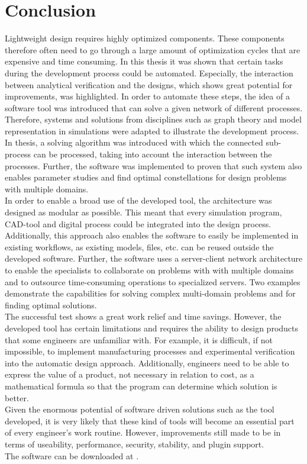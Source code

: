 \section{Conclusion}

Lightweight design requires highly optimized components.
These components therefore often need to go through a large amount of optimization cycles that are expensive and time consuming.
In this thesis it was shown that certain tasks during the development process could be automated.
Especially, the interaction between analytical verification and the designs, which shows great potential for improvements, was highlighted.
In order to automate these steps, the idea of a software tool was introduced that can solve a given network of different processes.
Therefore, systems and solutions from disciplines such as graph theory and model representation in simulations were adapted to illustrate the development process.
In thesis, a solving algorithm was introduced with which the connected sub-process can be processed, taking into account the interaction between the processes.
Further, the software was implemented to proven that such system also enables parameter studies and find optimal constellations for design problems with multiple domains.\\
In order to enable a broad use of the developed tool, the architecture was designed as modular as possible.
This meant that every simulation program, CAD-tool and digital process could be integrated into the design process.
Additionally, this approach also enables the software to easily be implemented in existing workflows, as existing models, files, etc. can be reused outside the developed software.
Further, the software uses a server-client network architecture to enable the specialists to collaborate on problems with with multiple domains and to outsource time-consuming operations to specialized servers.
Two examples demonstrate the capabilities for solving complex multi-domain problems and for finding optimal solutions.\\
The successful test shows a great work relief and time savings.
However, the developed tool has certain limitations and requires the ability to design products that some engineers are unfamiliar with.
For example, it is difficult, if not impossible, to implement manufacturing processes and experimental verification into the automatic design approach.
Additionally, engineers need to be able to express the value of a product, not necessary in relation to cost, as a mathematical formula so that the program can determine which solution is better.\\
Given the enormous potential of software driven solutions such as the tool developed, it is very likely that these kind of tools will become an essential part of every engineer's work routine.
However, improvements still made to be in terms of useability, performance, security, stability, and plugin support.\\
The software can be downloaded at \cite{git_mdd, git_client}.